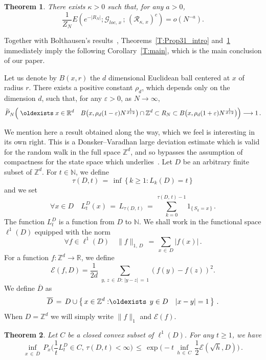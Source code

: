 \documentclass[10pt]{amsart}
\newtheorem{theo}{Theorem}[section]
\theoremstyle{definition}\newtheorem{defi}[theo]{Definition}\newtheorem{rema}[theo]{Remark}\newtheorem{exam}[theo]{Example}\newtheorem{exem}[theo]{Example}\newtheorem{nota}[theo]{Notation}
\newcommand*\bD{\overline{D}}
\newcommand*\Z {{\mathbb Z}}
\newcommand*\Zd {{\mathbb Z^d}}
\newcommand*\Rd {{\mathbb R^d}}
\newcommand*\R{\mathbb{R}}
\newcommand*\N {{\mathbb N}}
\newcommand*\E {{E}}
\newcommand*\wP{\smash{\widetilde P}}
\newcommand{\cE}{\mathcal{E}}
\newcommand{\cG}{\mathcal{G}}
\newcommand{\cR}{\mathcal{R}}
\renewcommand{\N}{\mathbb{N}}
\renewcommand*{\exists}{\mathrel{\oldexists}}
\let\oldforall\forall
\renewcommand*{\forall}{\mathrel{\oldforall}}
\begin{document}
\begin{theo}\label{T:filledball_intro}
There exists $\kappa>0$ such that, for any $a>0$,
\[
\frac1{Z_N}\E\left(e^{ - |R_N|} ; \cG_{loc,\,x}\,;\,(\cR_{\kappa,\,x})^c\right) = o(N^{-a}).
\]
\end{theo}

Together with Bolthausen's results~\cite[see p.~877, immediately below Conjecture~1.3]{BO}, Theorems~\ref{T:Prop31_intro} and~\ref{T:filledball_intro} immediately imply the following Corollary~\ref{T:main}, which is the main conclusion of our paper.

\begin{coro}\label{T:main}
Let us denote by $B(x,r)$ the $d$ dimensional Euclidean ball centered at $x$ of radius $r$. There exists a positive constant $\rho_d$, which depends only on the dimension $d$, such that, for any $\varepsilon>0$, as $N \to \infty$,
\[
\wP_N\Big(\exists x\in\Rd\quad B\big(x,\rho_d(1-\varepsilon)N^{\frac{1}{d+2}}\big)
\cap\Zd
\subset R_N
\subset
B\big(x,\rho_d(1+\varepsilon)N^{\frac{1}{d+2}}\big)\Big)\longrightarrow 1\,.
\]
\end{coro}


We mention here a result obtained along the way, which we feel is interesting in its own right. This is a Donsker--Varadhan large deviation estimate which is valid for the random walk in the full space $\mathbb{Z}^d$, and so bypasses the assumption of compactness for the state space which underlies~\cite{DV1}. Let $D$ be an arbitrary finite subset of $\Zd$. For $t\in \N$, we define
\[
\tau(D,t)\,=\,\inf\,\big\{\,k\geq 1:L_k(D)=t\,\big\}\,
\]
and we set
\[
\forall x\in D\quad
L_t^D(x)\,=\,L_{\tau(D,\,t)}\,=\,\sum_{k=0}^{\tau(D,\,t)-1}1_{\{\,S_k=x\,\}}\,.
\]
The function $L_t^D$ is a function from $D$ to $\N$. We shall work in the functional space $\ell^1(D)$ equipped with the norm
\[
\forall f\in\ell^1(D)\quad
\|f\|_{1,\,D}\,=\,\sum_{x\,\in\,D}|f(x)|\,.
\]
For a function $f: \Z^d \to \R$, we define
\begin{equation}\label{defE}
\cE(f,D) = \frac1{2d}\;\sum_{y,\,z\,\in\,D:\,| y -z|\,=\,1} (f(y) - f(z))^2.
\end{equation}
We define $\bD$ as
\[
\bD\,=\,D\cup\left\{\,x\in\Zd:\exists\, y\in D\quad |x-y|=1\,\right\}\,.
\]
When $D = \Z^d$ we will simply write $\|f\|_1$ and $\cE(f)$.
\begin{theo}\label{GD}
Let $C$ be a closed convex subset of $\ell^1(D)$. For any $t\geq 1$, we have
\[
\inf_{x\,\in\,\bD}\,P_x\bigg(\frac{1}{t}L_t^D\in C,\,
\tau(D,t)<\infty\bigg)\,\leq\,
\exp\bigg(-t\,\inf_{h\,\in\,C}\,\frac{1}{2}\cE(\sqrt{h},D)
\bigg)
\,.
\]
\end{theo}
\end{document}
